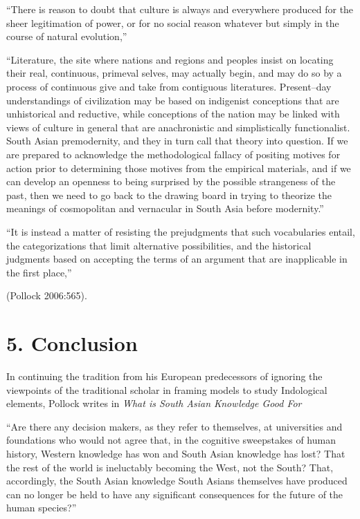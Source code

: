 “There is reason to doubt that culture is always and everywhere produced for the sheer legitimation of power, or for no social reason whatever but simply in the course of natural evolution,”

“Literature, the site where nations and regions and peoples insist on locating their real, continuous, primeval selves, may actually begin, and may do so by a process of continuous give and take from contiguous literatures. Present–day understandings of civilization may be based on indigenist conceptions that are unhistorical and reductive, while conceptions of the nation may be linked with views of culture in general that are anachronistic and simplistically functionalist. South Asian premodernity, and they in turn call that theory into question. If we are prepared to acknowledge the methodological fallacy of positing motives for action prior to determining those motives from the empirical materials, and if we can develop an openness to being surprised by the possible strangeness of the past, then we need to go back to the drawing board in trying to theorize the meanings of cosmopolitan and vernacular in South Asia before modernity.”

\begin{myquote}
“It is instead a matter of resisting the prejudgments that such vocabularies entail, the categorizations that limit alternative possibilities, and the historical judgments based on accepting the terms of an argument that are inapplicable in the first place,”
\end{myquote}

\hfill (Pollock 2006:565).


\section*{5. Conclusion}

In continuing the tradition from his European predecessors of ignoring the viewpoints of the traditional scholar in framing models to study Indological elements, Pollock writes in \textit{What is South Asian Knowledge Good For}

\begin{myquote}
“Are there any decision makers, as they refer to themselves, at universities and foundations who would not agree that, in the cognitive sweepstakes of human history, Western knowledge has won and South Asian knowledge has lost? That the rest of the world is ineluctably becoming the West, not the South? That, accordingly, the South Asian knowledge South Asians themselves have produced can no longer be held to have any significant consequences for the future of the human species?”
\end{myquote}

